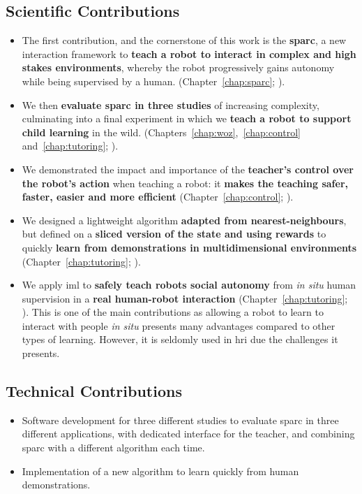 \subsection{Scientific Contributions}
\begin{itemize}
	\item The first contribution, and the cornerstone of this work is the \textbf{\acrfull{sparc}}, a new interaction framework to \textbf{teach a robot to interact in complex and high stakes environments}, whereby the robot progressively gains autonomy while being supervised by a human. (Chapter~\ref{chap:sparc}; \citealt{senft2015human,senft2015sparc}).
	\item We then \textbf{evaluate \gls{sparc} in three studies} of increasing complexity, culminating into a final experiment in which we \textbf{teach a robot to support child learning} in the wild. (Chapters~\ref{chap:woz},~\ref{chap:control} and~\ref{chap:tutoring}; \citealt{senft2015sparc,senft2017supervised,senft2018robots}).
	\item We demonstrated the impact and importance of the \textbf{teacher's control over the robot's action} when teaching a robot: it \textbf{makes the teaching safer, faster, easier and more efficient} (Chapter~\ref{chap:control}; \citealt{senft2016sparc,senft2017supervised}).
	\item We designed a lightweight algorithm \textbf{adapted from nearest-neighbours}, but defined on a \textbf{sliced version of the state and using rewards} to quickly \textbf{learn from demonstrations in multidimensional environments} (Chapter~\ref{chap:tutoring}; \citealt{senft2017toward}).
	\item We apply \acrlong{iml} to \textbf{safely teach robots social autonomy} from \textit{in situ} human supervision in a \textbf{real human-robot interaction} (Chapter~\ref{chap:tutoring}; \citealt{senft2018robots}). This is one of the main contributions as allowing a robot to learn to interact with people \textit{in situ} presents many advantages compared to other types of learning. However, it is seldomly used in \gls{hri} due the challenges it presents.
\end{itemize}

\subsection{Technical Contributions}
\begin{itemize}
	\item Software development for three different studies to evaluate \gls{sparc} in three different applications, with dedicated interface for the teacher, and combining \gls{sparc} with a different algorithm each time.
	\item Implementation of a new algorithm to learn quickly from human demonstrations.
\end{itemize}
